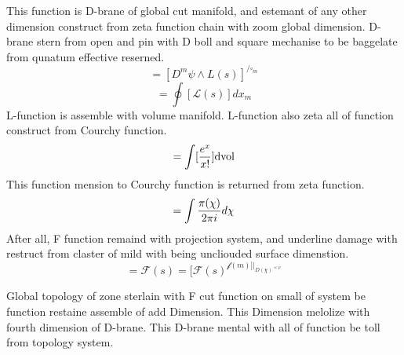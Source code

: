 \documentclass{jsarticle}
\begin{document}
    This function is D-brane of global cut manifold, and estemant of
  any other dimension construct from zeta function chain with
  zoom global dimension.
    D-brane stern from open and pin with D boll and square
    mechanise to be baggelate from qunatum effective reserned. 
  $$ = [D^{m}\psi \wedge L(s)]^{{/} \square_m }$$
  $$ = \oint[\mathcal{L}(s)]dx_m $$
    L-function is assemble with volume manifold.
  L-function also zeta all of function construct from Courchy function.
  $$ = \int [{e^{x} \over {x!}}]\mathrm{dvol} $$
     This function mension to 
  Courchy function is returned from zeta function.
  $$ = \int {\pi(\chi) \over {2 \pi i}}d\chi $$
     After all, F function remaind with projection system,
  and underline damage with restruct from claster of mild 
  with being uncliouded surface dimenstion.
  $$ = \mathcal{F}(s) = [{\mathcal{F}(s)^{{\mathcal{f}(m)}]|_{{D(\chi)}^
  {\ll p}}}} $$

     Global topology of zone sterlain with F cut function on small of
  system be function restaine assemble of add Dimension.
  This Dimension melolize with fourth dimension of D-brane.
  This D-brane mental with all of function be toll from topology
  system.
\end{document}
